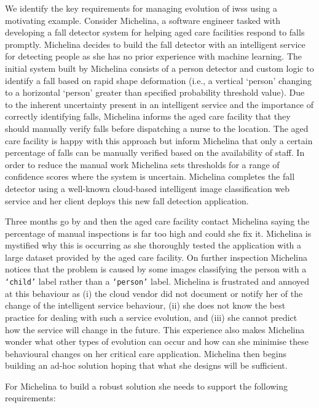 We identify the key requirements for managing evolution of \glspl{iws} using a motivating example. Consider Michelina, a software engineer tasked with developing a fall detector system for helping aged care facilities respond to falls promptly. Michelina decides to build the fall detector with an intelligent service for detecting people as she has no prior experience with machine learning. The initial system built by Michelina consists of a person detector and custom logic to identify a fall based on rapid shape deformation (i.e., a vertical `person' changing to a horizontal `person' greater than specified probability threshold value). Due to the inherent uncertainty present in an intelligent service and the importance of correctly identifying falls, Michelina informs the aged care facility that they should manually verify falls before dispatching a nurse to the location. The aged care facility is happy with this approach but inform Michelina that only a certain percentage of falls can be manually verified based on the availability of staff. In order to reduce the manual work Michelina sets thresholds for a range of confidence scores where the system is uncertain. Michelina completes the fall detector using a well-known cloud-based intelligent image classification web service and her client deploys this new fall detection application. 

Three months go by and then the aged care facility contact Michelina saying the percentage of manual inspections is far too high and could she fix it. Michelina is mystified why this is occurring as she thoroughly tested the application with a large dataset provided by the aged care facility. On further inspection Michelina notices that the problem is caused by some images classifying the person with a \texttt{`child'} label rather than a \texttt{`person'} label. Michelina is frustrated and annoyed at this behaviour as (i) the cloud vendor did not document or notify her of the change of the intelligent service behaviour, (ii) she does not know the best practice for dealing with such a service evolution, and (iii) she cannot predict how the service will change in the future. This experience also makes Michelina wonder what other types of evolution can occur and how can she minimise these behavioural changes on her critical care application. Michelina then begins building an ad-hoc solution hoping that what she designs will be sufficient. 

For Michelina to build a robust solution she needs to support the following requirements:

